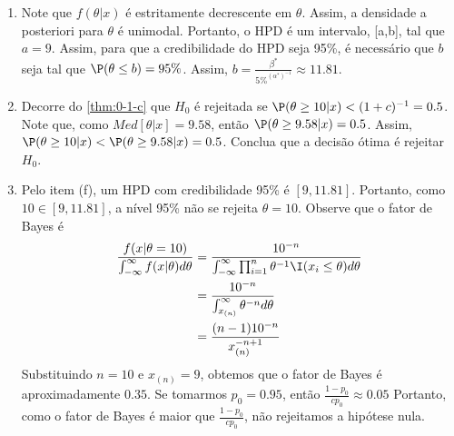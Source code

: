 {\begin{enumerate}[label=(\alph*)]
  $\P(\theta \leq b|x) = \frac{95}{100}$.
  Assim, $a=\frac{\beta^{*}}{95\%^{(\alpha^{*})^{-1}}}$ e
  $b=\frac{\beta^{*}}{5\%^{(\alpha^{*})^{-1}}}$.
  Substituindo $\alpha^{*}=11$ e $\beta^{*}=9$,
  obtemos $a \approx 9.04$ e $b \approx 11.81$.
  \item Note que $f(\theta|x)$ é 
  estritamente decrescente em $\theta$.
  Assim, a densidade a posteriori para $\theta$ é unimodal.
  Portanto, o HPD é um intervalo, [a,b], tal que
 $a=9$.
  Assim, para que a credibilidade do HPD seja 95\%, 
  é necessário que $b$ seja tal que 
  $\P(\theta \leq b) = 95\%$.
  Assim, $b=\frac{\beta^{*}}{5\%^{(\alpha^{*})^{-1}}} \approx 11.81$.
  \item Decorre do \cref{thm:0-1-c} que 
  $H_{0}$ é rejeitada se 
  $\P(\theta \geq 10|x) < (1+c)^{-1} = 0.5$.
  Note que, como $Med[\theta|x]=9.58$, 
  então $\P(\theta \geq 9.58|x) = 0.5$.
  Assim, $\P(\theta \geq 10|x) < \P(\theta \geq 9.58|x) =   0.5$.
  Conclua que a decisão ótima é rejeitar $H_{0}$.
  \item Pelo item (f), 
  um HPD com credibilidade 95\% é $[9,11.81]$.
  Portanto, como $10 \in [9,11.81]$,
  a nível 95\% não se rejeita $\theta=10$.
  Observe que o fator de Bayes é 
  \begin{align*}
   \frac{f(x|\theta=10)}{\int_{-\infty}^{\infty}{f(x|\theta)d\theta}} 
   &= \frac{10^{-n}}{\int_{-\infty}^{\infty}{\prod_{i=1}^{n}{\theta^{-1}\I(x_{i} \leq \theta)}d\theta}} \\
   &= \frac{10^{-n}}{\int_{x_{(n)}}^{\infty}{\theta^{-n}d\theta}} \\
   &= \frac{(n-1)10^{-n}}{x_{(n)}^{-n+1}} 
  \end{align*}
  Substituindo $n=10$ e $x_{(n)}=9$, 
  obtemos que o fator de Bayes é aproximadamente $0.35$.
  Se tomarmos $p_{0}=0.95$, então 
  $\frac{1-p_{0}}{cp_{0}} \approx 0.05$
  Portanto, como o fator de Bayes é maior que 
  $\frac{1-p_{0}}{cp_{0}}$,
  não rejeitamos a hipótese nula.
 \end{enumerate}
}{}

